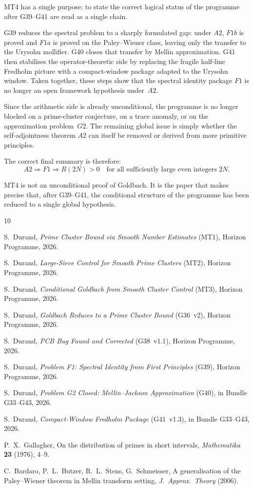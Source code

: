 \documentclass[11pt,a4paper]{article}
\begin{document}
MT4 has a single purpose: to state the correct logical status of the programme after G39--G41 are read as a single chain.

G39 reduces the spectral problem to a sharply formulated gap: under $A2$, $F1b$ is proved and $F1a$ is proved on the Paley--Wiener class, leaving only the transfer to the Urysohn mollifier.  G40 closes that transfer by Mellin approximation.  G41 then stabilises the operator-theoretic side by replacing the fragile half-line Fredholm picture with a compact-window package adapted to the Urysohn window.  Taken together, these steps show that the spectral identity package $F1$ is no longer an open framework hypothesis under~$A2$.

Since the arithmetic side is already unconditional, the programme is no longer blocked on a prime-cluster conjecture, on a trace anomaly, or on the approximation problem~$G2$.  The remaining global issue is simply whether the self-adjointness theorem $A2$ can itself be removed or derived from more primitive principles.

The correct final summary is therefore:
\[
\boxed{A2 \Longrightarrow F1 \Longrightarrow R(2N)>0 \quad\text{for all sufficiently large even integers } 2N.}
\]

MT4 is not an unconditional proof of Goldbach.  It is the paper that makes precise that, after G39--G41, the conditional structure of the programme has been reduced to a single global hypothesis.

\begin{thebibliography}{10}

 S.~Durand, \emph{Prime Cluster Bound via Smooth Number Estimates} (MT1), Horizon Programme, 2026.

 S.~Durand, \emph{Large-Sieve Control for Smooth Prime Clusters} (MT2), Horizon Programme, 2026.

 S.~Durand, \emph{Conditional Goldbach from Smooth Cluster Control} (MT3), Horizon Programme, 2026.

 S.~Durand, \emph{Goldbach Reduces to a Prime Cluster Bound} (G36~v2), Horizon Programme, 2026.

 S.~Durand, \emph{PCB Bug Found and Corrected} (G38~v1.1), Horizon Programme, 2026.

 S.~Durand, \emph{Problem F1: Spectral Identity from First Principles} (G39), Horizon Programme, 2026.

 S.~Durand, \emph{Problem G2 Closed: Mellin--Jackson Approximation} (G40), in Bundle G33--G43, 2026.

 S.~Durand, \emph{Compact-Window Fredholm Package} (G41~v1.3), in Bundle G33--G43, 2026.

 P.~X.~Gallagher, On the distribution of primes in short intervals, \emph{Mathematika} \textbf{23} (1976), 4--9.

 C.~Bardaro, P.~L.~Butzer, R.~L.~Stens, G.~Schmeisser, A generalisation of the Paley--Wiener theorem in Mellin transform setting, \emph{J.~Approx.~Theory} (2006).

\end{thebibliography}
\end{document}
